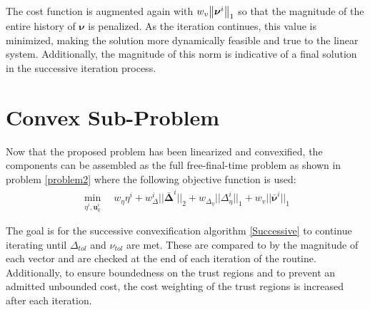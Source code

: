 \documentclass[conf]{new-aiaa}
\begin{document}
The cost function is augmented again with $w_v \norm{\bm{\nu}^i}_1$ so that the magnitude of the entire history of $\bm{\nu}$ is penalized. As the iteration continues, this value is minimized, making the solution more dynamically feasible and true to the linear system. Additionally, the magnitude of this norm is indicative of a final solution in the successive iteration process.

\clearpage
\section{Convex Sub-Problem}
Now that the proposed problem has been linearized and convexified, the components can be assembled as the full free-final-time problem as shown in problem \ref{problem2} where the following objective function is used:
\begin{align}
	\min_{\eta^i, \mathbf{u}_k^i} \quad w_\eta \eta^i + w_\Delta^i || \bm{\bar{\Delta}}^i ||_2 + w_{\Delta_\eta} || \Delta_\eta^i ||_1 + w_v || \bar{\bm{\nu}}^i ||_1
\end{align}

The goal is for the successive convexification algorithm \ref{Successive} to continue iterating until $\Delta_{tol}$ and $\nu_{tol}$ are met. These are compared to by the magnitude of each vector and are checked at the end of each iteration of the routine. Additionally, to ensure boundedness on the trust regions and to prevent an admitted unbounded cost, the cost weighting of the trust regions is increased after each iteration.
\end{document}

